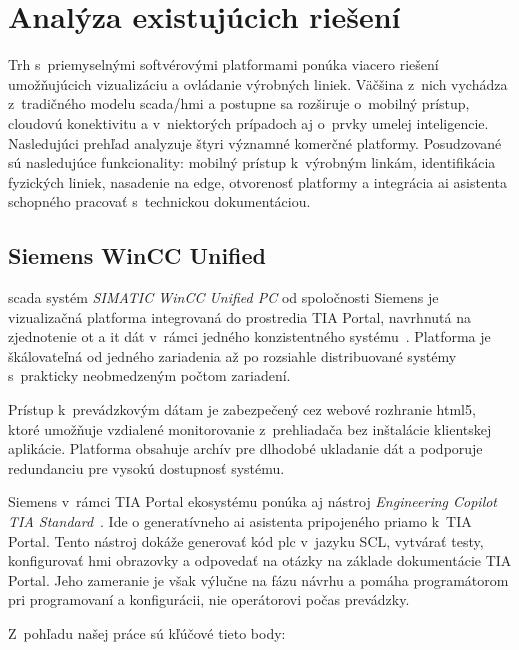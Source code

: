 \section{Analýza existujúcich riešení}\label{sec:existing_solutions}

Trh s~priemyselnými softvérovými platformami ponúka viacero riešení
umožňujúcich vizualizáciu a ovládanie výrobných liniek. Väčšina z~nich
vychádza z~tradičného modelu \acrshort{scada}/\acrshort{hmi} a postupne sa
rozširuje o~mobilný prístup, cloudovú konektivitu a v~niektorých prípadoch aj
o~prvky umelej inteligencie. Nasledujúci prehľad analyzuje štyri významné
komerčné platformy. Posudzované sú nasledujúce funkcionality: mobilný prístup
k~výrobným linkám, identifikácia fyzických liniek, nasadenie na edge, otvorenosť
platformy a integrácia \acrshort{ai} asistenta schopného pracovať s~technickou
dokumentáciou.

\subsection{Siemens WinCC Unified}

\acrshort{scada} systém \textit{SIMATIC WinCC Unified PC} od spoločnosti Siemens je
vizualizačná platforma integrovaná do prostredia TIA Portal, navrhnutá na
zjednotenie \acrshort{ot} a \acrshort{it} dát v~rámci jedného konzistentného
systému~\cite{t00}. Platforma je škálovateľná od jedného zariadenia
až po rozsiahle distribuované systémy s~prakticky neobmedzeným počtom zariadení.

Prístup k~prevádzkovým dátam je zabezpečený cez webové rozhranie
\acrshort{html}5, ktoré umožňuje vzdialené monitorovanie z~prehliadača bez
inštalácie klientskej aplikácie. Platforma obsahuje archív pre dlhodobé
ukladanie dát a podporuje redundanciu pre vysokú dostupnosť systému.

Siemens v~rámci TIA Portal ekosystému ponúka aj nástroj \textit{Engineering
      Copilot TIA Standard}~\cite{t01}. Ide o generatívneho \acrshort{ai} asistenta
pripojeného priamo k~TIA Portal. Tento nástroj dokáže generovať kód
\acrshort{plc} v~jazyku SCL, vytvárať testy, konfigurovať \acrshort{hmi}
obrazovky a odpovedať na otázky na základe dokumentácie TIA Portal. Jeho
zameranie je však výlučne na fázu návrhu a pomáha programátorom pri
programovaní a konfigurácii, nie operátorovi počas prevádzky.

Z~pohľadu našej práce sú kľúčové tieto body:

